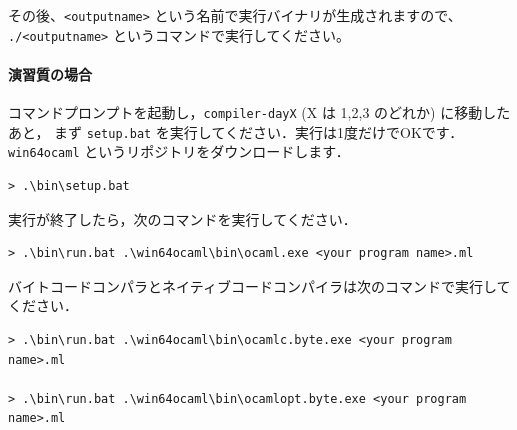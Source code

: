 \documentclass[a4paper,11pt]{jsarticle}
\begin{document}
その後、\verb|<outputname>| という名前で実行バイナリが生成されますので、
\verb|./<outputname>| というコマンドで実行してください。

\paragraph*{演習質の場合}

コマンドプロンプトを起動し，\verb|compiler-dayX| (X は 1,2,3 のどれか) に移動したあと，
まず \verb|setup.bat| を実行してください．実行は1度だけでOKです．\verb|win64ocaml| というリポジトリをダウンロードします．

\begin{lstlisting}
> .\bin\setup.bat
\end{lstlisting}

実行が終了したら，次のコマンドを実行してください．

\begin{lstlisting}
> .\bin\run.bat .\win64ocaml\bin\ocaml.exe <your program name>.ml
\end{lstlisting}

バイトコードコンパラとネイティブコードコンパイラは次のコマンドで実行してください．

\begin{lstlisting}
> .\bin\run.bat .\win64ocaml\bin\ocamlc.byte.exe <your program name>.ml

> .\bin\run.bat .\win64ocaml\bin\ocamlopt.byte.exe <your program name>.ml
\end{lstlisting}






\end{document}
